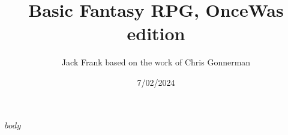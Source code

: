\documentclass[11pt, oneside]{report} %
\begin{document}
\title{Basic Fantasy RPG, OnceWas edition}
\author{Jack Frank based on the work of Chris Gonnerman}
\date{7/02/2024}
\maketitle

\tableofcontents

\raggedright

$body$ %
\end{document}
